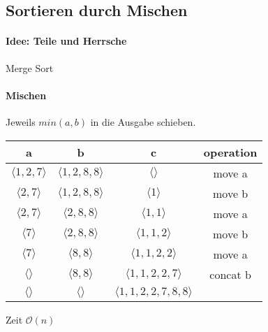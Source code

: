 \documentclass[a4paper]{scrartcl}
\begin{document}
	\subsection{Sortieren durch Mischen} 
	\paragraph{Idee: Teile und Herrsche}
	
	\begin{algorithm}
		\caption{Merge Sort}
		\DontPrintSemicolon
	
	\end{algorithm}
	
	
	
	\paragraph{Mischen} 
	Jeweils \( min(a, b) \) in die Ausgabe schieben.
	
	\begin{table}
		\centering
		\begin{tabular}{|c c|c c|}
			\hline
			a&b&c&operation\\
			\hline
			\( \langle 1, 2, 7 \rangle \) & \( \langle 1, 2, 8, 8  \rangle \) &\( \langle   \rangle \) & move a \\
			\( \langle 2, 7 \rangle \) & \( \langle 1, 2, 8, 8  \rangle \) &\( \langle 1  \rangle \) & move  b \\
			\( \langle 2, 7 \rangle \) & \( \langle 2, 8, 8  \rangle \) &\( \langle 1, 1  \rangle \) & move a \\
			\( \langle 7 \rangle \) & \( \langle 2, 8, 8  \rangle \) &\( \langle 1, 1, 2  \rangle \) & move b\\
			\( \langle 7 \rangle \) & \( \langle  8, 8  \rangle \) &\( \langle 1, 1, 2, 2  \rangle \) & move a \\
			\( \langle  \rangle \) & \( \langle  8, 8  \rangle \) &\( \langle 1, 1, 2, 2 , 7  \rangle \) & concat b \\
			\hline
			\( \langle  \rangle \) & \( \langle  \rangle \) &\( \langle 1, 1, 2, 2 , 7, 8, 8  \rangle \) & \\
			\hline
		\end{tabular}
	\end{table}
	Zeit \( \mathcal{O}(n) \)
	
\end{document}
